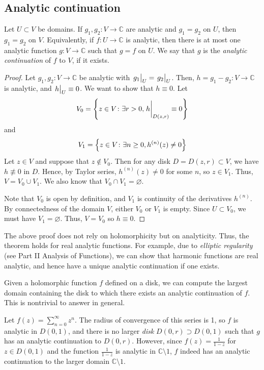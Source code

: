 \subsection{Analytic continuation}
\begin{theorem}
	Let \( U \subset V \) be domains.
	If \( g_1, g_2 \colon V \to \mathbb C \) are analytic and \( g_1 = g_2 \) on \( U \), then \( g_1 = g_2 \) on \( V \).
	Equivalently, if \( f \colon U \to \mathbb C \) is analytic, then there is at most one analytic function \( g \colon V \to \mathbb C \) such that \( g = f \) on \( U \).
	We say that \( g \) is the \textit{analytic continuation} of \( f \) to \( V \), if it exists.
\end{theorem}
\begin{proof}
	Let \( g_1, g_2 \colon V \to \mathbb C \) be analytic with \( \eval{g_1}_U = \eval{g_2}_U \).
	Then, \( h = g_1 - g_2 \colon V \to \mathbb C \) is analytic, and \( \eval{h}_U \equiv 0 \).
	We want to show that \( h \equiv 0 \).
	Let
	\[ V_0 = \qty{z \in V \colon \exists r > 0, \eval{h}_{D(z,r)} \equiv 0} \]
	and
	\[ V_1 = \qty{z \in V \colon \exists n \geq 0, h^{(n)}(z) \neq 0} \]
	Let \( z \in V \) and suppose that \( z \not\in V_0 \).
	Then for any disk \( D = D(z,r) \subset V \), we have \( h \not\equiv 0 \) in \( D \).
	Hence, by Taylor series, \( h^{(n)}(z) \neq 0 \) for some \( n \), so \( z \in V_1 \).
	Thus, \( V = V_0 \cup V_1 \).
	We also know that \( V_0 \cap V_1 = \varnothing \).

	Note that \( V_0 \) is open by definition, and \( V_1 \) is continuity of the derivatives \( h^{(n)} \).
	By connectedness of the domain \( V \), either \( V_0 \) or \( V_1 \) is empty.
	Since \( U \subset V_0 \), we must have \( V_1 = \varnothing \).
	Thus, \( V = V_0 \) so \( h \equiv 0 \).
\end{proof}
\begin{remark}
	The above proof does not rely on holomorphicity but on analyticity.
	Thus, the theorem holds for real analytic functions.
	For example, due to \textit{elliptic regularity} (see Part II Analysis of Functions), we can show that harmonic functions are real analytic, and hence have a unique analytic continuation if one exists.
\end{remark}
Given a holomorphic function \( f \) defined on a disk, we can compute the largest domain containing the disk to which there exists an analytic continuation of \( f \).
This is nontrivial to answer in general.
\begin{example}
	Let \( f(z) = \sum_{n=0}^\infty z^n \).
	The radius of convergence of this series is 1, so \( f \) is analytic in \( D(0,1) \), and there is no larger \textit{disk} \( D(0,r) \supset D(0,1) \) such that \( g \) has an analytic continuation to \( D(0,r) \).
	However, since \( f(z) = \frac{1}{1-z} \) for \( z \in D(0,1) \) and the function \( \frac{1}{1-z} \) is analytic in \( \mathbb C \setminus \qty{1} \), \( f \) indeed has an analytic continuation to the larger domain \( \mathbb C \setminus \qty{1} \).
\end{example}
